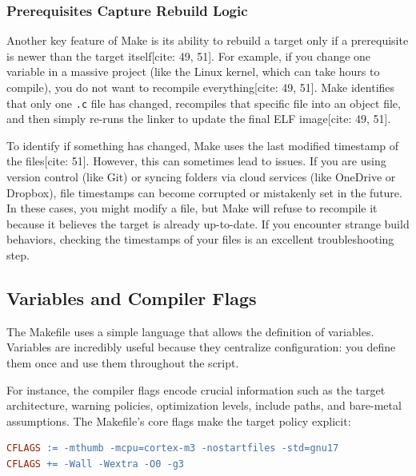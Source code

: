 \subsubsection{Prerequisites Capture Rebuild Logic}
Another key feature of Make is its ability to rebuild a target only if a prerequisite is newer than the target itself[cite: 49, 51]. For example, if you change one variable in a massive project (like the Linux kernel, which can take hours to compile), you do not want to recompile everything[cite: 49, 51]. Make identifies that only one \texttt{.c} file has changed, recompiles that specific file into an object file, and then simply re-runs the linker to update the final ELF image[cite: 49, 51].

To identify if something has changed, Make uses the last modified timestamp of the files[cite: 51]. However, this can sometimes lead to issues. If you are using version control (like Git) or syncing folders via cloud services (like OneDrive or Dropbox), file timestamps can become corrupted or mistakenly set in the future. In these cases, you might modify a file, but Make will refuse to recompile it because it believes the target is already up-to-date. If you encounter strange build behaviors, checking the timestamps of your files is an excellent troubleshooting step.

\subsection{Variables and Compiler Flags}
The Makefile uses a simple language that allows the definition of variables. Variables are incredibly useful because they centralize configuration: you define them once and use them throughout the script.

For instance, the compiler flags encode crucial information such as the target architecture, warning policies, optimization levels, include paths, and bare-metal assumptions. The Makefile's core flags make the target policy explicit:

\begin{lstlisting}[language=make]
CFLAGS := -mthumb -mcpu=cortex-m3 -nostartfiles -std=gnu17
CFLAGS += -Wall -Wextra -O0 -g3
\end{lstlisting}

